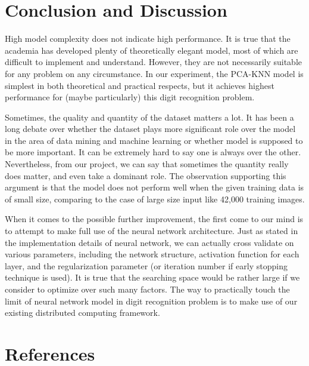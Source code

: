 \documentclass{article} %
\begin{document}
\section{Conclusion and Discussion} \label{Conclu}

High model complexity does not indicate high performance. It is true that the academia
has developed plenty of theoretically elegant model, most of which are
difficult to implement and understand. However, they are not necessarily suitable
for any problem on any circumstance. In our experiment, the PCA-KNN model is
simplest in both theoretical and practical respects, but it achieves highest
performance for (maybe particularly) this digit recognition problem.

Sometimes, the quality and quantity of the dataset matters a lot. It has been
a long debate over whether the dataset plays more significant role over the
model in the area of data mining and machine learning or whether model is
supposed to be more important. It can be extremely hard to say one is always
over the other. Nevertheless, from our project, we can say that sometimes the
quantity really does matter, and even take a dominant role. The observation
supporting this argument is that the \knn model does not perform well when the
given training data is of small size, comparing to the case of large size
input like 42,000 training images.  


When it comes to the possible further improvement, the first come to our mind
is to attempt to make full use of the neural network architecture. Just as
stated in the implementation details of neural network, we can actually cross
validate on various parameters, including the network structure, activation
function for each layer, and the regularization parameter (or iteration number
if early stopping technique is used). It is true that the searching space
would be rather large if we consider to optimize over such many factors. The
way to practically touch the limit of neural network model in digit
recognition problem is to make use of our existing distributed computing
framework.

\section{References}
\end{document}
